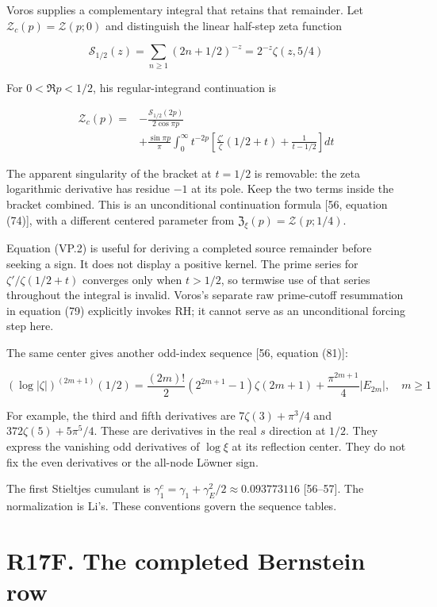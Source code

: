 \documentclass[
  11pt,
]{book}
\begin{document}
Voros supplies a complementary integral that retains that remainder. Let
\(\mathcal Z_c(p)=\mathcal Z(p;0)\) and distinguish the linear half-step
zeta function

\[
\mathcal S_{1/2}(z)=\sum_{n\ge1}(2n+1/2)^{-z}
=2^{-z}\zeta(z,5/4)
\tag{VP.1}
\]

For \(0<\Re p<1/2\), his regular-integrand continuation is

\[
\begin{aligned}
\mathcal Z_c(p)
={}&-\frac{\mathcal S_{1/2}(2p)}{2\cos\pi p}\\
&+\frac{\sin\pi p}{\pi}\int_0^\infty t^{-2p}
\left[\frac{\zeta'}{\zeta}(1/2+t)+\frac1{t-1/2}\right]dt
\end{aligned}
\tag{VP.2}
\]

The apparent singularity of the bracket at \(t=1/2\) is removable: the
zeta logarithmic derivative has residue \(-1\) at its pole. Keep the two
terms inside the bracket combined. This is an unconditional continuation
formula {[}56, equation (74){]}, with a different centered parameter
from \(\mathfrak Z_\xi(p)=\mathcal Z(p;1/4)\).

Equation (VP.2) is useful for deriving a completed source remainder
before seeking a sign. It does not display a positive kernel. The prime
series for \(\zeta'/\zeta(1/2+t)\) converges only when \(t>1/2\), so
termwise use of that series throughout the integral is invalid. Voros's
separate raw prime-cutoff resummation in equation (79) explicitly
invokes RH; it cannot serve as an unconditional forcing step here.

The same center gives another odd-index sequence {[}56, equation
(81){]}:

\[
\boxed{(\log|\zeta|)^{(2m+1)}(1/2)
=\frac{(2m)!}{2}(2^{2m+1}-1)\zeta(2m+1)
+\frac{\pi^{2m+1}}4|E_{2m}|,\quad m\ge1}
\tag{VP.3}
\]

For example, the third and fifth derivatives are \(7\zeta(3)+\pi^3/4\)
and \(372\zeta(5)+5\pi^5/4\). These are derivatives in the real \(s\)
direction at \(1/2\). They express the vanishing odd derivatives of
\(\log\xi\) at its reflection center. They do not fix the even
derivatives or the all-node Löwner sign.

The first Stieltjes cumulant is
\(\gamma_1^c=\gamma_1+\gamma_E^2/2\approx0.093773116\) {[}56--57{]}. The
normalization is Li's. These conventions govern the sequence tables.

\section{R17F. The completed Bernstein
row}\label{r17f.-the-completed-bernstein-row}
\end{document}

